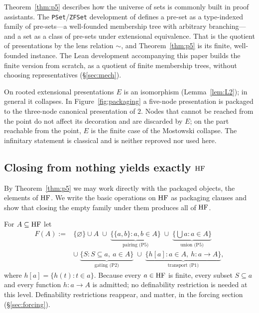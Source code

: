 \begin{remark}\label{rem:mathlib}
Theorem~\ref{thm:p5} describes how the universe of sets is commonly built in proof assistants.
The \texttt{PSet}/\texttt{ZFSet} development of \citet{Mathlib2020} defines a pre-set as a
type-indexed family of pre-sets---a well-founded membership tree with arbitrary branching---and a
set as a class of pre-sets under extensional equivalence. That is the quotient of presentations
by the lens relation $\sim$, and Theorem~\ref{thm:p5} is its finite, well-founded instance. The
Lean development accompanying this paper builds the finite version from scratch, as a quotient of
finite membership trees, without choosing representatives (\S\ref{sec:mech}).
\end{remark}

\begin{remark}\label{rem:finitemostowski}
On rooted extensional presentations $E$ is an isomorphism (Lemma~\ref{lem:L2}); in general it
collapses. In Figure~\ref{fig:packaging} a five-node presentation is packaged to the three-node
canonical presentation of $2$. Nodes that cannot be reached from the point do not affect its
decoration and are discarded by $E$; on the part reachable from the point, $E$ is the finite case
of the Mostowski collapse. The infinitary statement is classical and is neither reproved nor used
here.
\end{remark}

\subsection{Closing from nothing yields exactly \texorpdfstring{$\mathrm{HF}$}{HF}}\label{ssec:hf}

By Theorem~\ref{thm:p5} we may work directly with the packaged objects, the elements of $\mathrm{HF}$. We
write the basic operations on $\mathrm{HF}$ as packaging clauses and show that closing the empty family
under them produces all of $\mathrm{HF}$.

\begin{definition}\label{def:F}
For $A\subseteq\mathrm{HF}$ let
\[
  \begin{aligned}
  F(A):={}&\{\varnothing\}\cup A
  \;\cup\;\underbrace{\{\{a,b\}:a,b\in A\}}_{\text{pairing (P5)}}
  \;\cup\;\underbrace{\{\textstyle\bigcup a:a\in A\}}_{\text{union (P5)}}\\
  &\cup\;\underbrace{\{S:S\subseteq a,\ a\in A\}}_{\text{gating (P2)}}
  \;\cup\;\underbrace{\{h[a]:a\in A,\ h\colon a\to A\}}_{\text{transport (P1)}},
  \end{aligned}
\]
where $h[a]=\{h(t):t\in a\}$. Because every $a\in\mathrm{HF}$ is finite, every subset $S\subseteq a$ and
every function $h\colon a\to A$ is admitted; no definability restriction is needed at this level.
Definability restrictions reappear, and matter, in the forcing section (\S\ref{sec:forcing}).
\end{definition}

